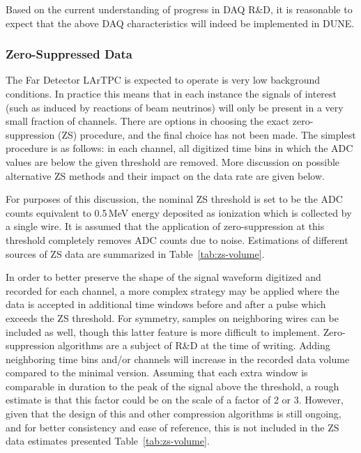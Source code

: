 \noindent
Based on the current understanding of progress in DAQ R\&D, it is reasonable to expect 
that the above DAQ characteristics will indeed be implemented in DUNE.




\subsubsection{Zero-Suppressed Data}
\label{sec:zs-data}
The Far Detector LArTPC is expected to operate is very low background conditions. In practice
this means that in each instance the signals of interest (such as induced by reactions of beam neutrinos)
will only be present in a very small fraction of channels. There are options in choosing the exact zero-suppression (ZS)
procedure, and the final choice has not been made. The simplest procedure is
as follows: in each channel, all digitized time bins in which the ADC values are below the given threshold
are removed. More discussion on possible alternative ZS methods and their impact on the data rate are given below.

For purposes of this discussion, the nominal ZS threshold is set to be the ADC counts equivalent to 0.5\,MeV energy deposited
as ionization which is collected by a single wire. It is assumed that the application of zero-suppression at this
threshold completely removes ADC counts due to noise. %
Estimations of different sources of ZS data are summarized in Table~\ref{tab:zs-volume}.

In order to better preserve the shape of the signal waveform digitized and recorded for
each channel, a more complex strategy may be applied where the data is accepted in additional
time windows before and after a pulse which exceeds the ZS threshold.  For symmetry, samples on neighboring
wires can be included as well, though this latter feature is more difficult to implement.
Zero-suppression algorithms are a subject of R\&D at the time of writing.   Adding neighboring time bins
and/or channels will increase in the recorded data volume compared to the minimal version. Assuming that
each extra window is comparable in duration to the peak of the signal above the threshold,
a rough estimate is that this factor could be on the scale of a factor of 2 or 3. However, given
that the design of this and other compression algorithms is still ongoing, and for better consistency
and ease of reference, this is not included in the ZS data estimates presented Table~\ref{tab:zs-volume}.
	
